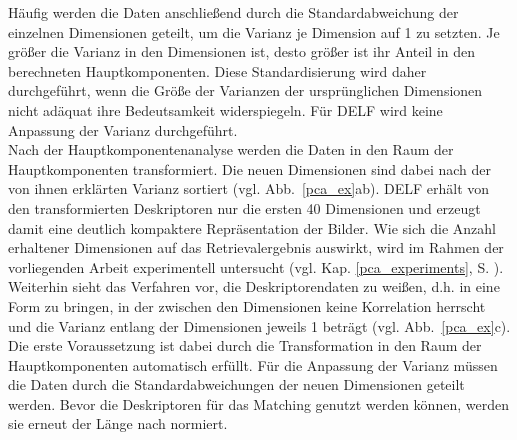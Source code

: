 Häufig werden die Daten anschließend durch die Standardabweichung der einzelnen Dimensionen geteilt, um die Varianz je Dimension auf 1 zu setzten. Je größer die Varianz in den Dimensionen ist, desto größer ist ihr Anteil in den berechneten Hauptkomponenten. Diese Standardisierung wird daher durchgeführt, wenn die Größe der Varianzen der ursprünglichen Dimensionen nicht adäquat ihre Bedeutsamkeit widerspiegeln. Für DELF wird keine Anpassung der Varianz durchgeführt.
\\
Nach der Hauptkomponentenanalyse werden die Daten in den Raum der Hauptkomponenten transformiert. Die neuen Dimensionen sind dabei nach der von ihnen erklärten Varianz sortiert (vgl. Abb.~\ref{pca_ex}ab). DELF erhält von den transformierten Deskriptoren nur die ersten 40 Dimensionen und erzeugt damit eine deutlich kompaktere Repräsentation der Bilder. Wie sich die Anzahl erhaltener Dimensionen auf das Retrievalergebnis auswirkt, wird im Rahmen der vorliegenden Arbeit experimentell untersucht (vgl. Kap. \ref{pca_experiments}, S. \pageref{pca_experiments}). Weiterhin sieht das Verfahren vor, die Deskriptorendaten zu weißen, d.h. in eine Form zu bringen, in der zwischen den Dimensionen keine Korrelation herrscht und die Varianz entlang der Dimensionen jeweils 1 beträgt (vgl. Abb.~\ref{pca_ex}c). Die erste Voraussetzung ist dabei durch die Transformation in den Raum der Hauptkomponenten automatisch erfüllt. Für die Anpassung der Varianz müssen die Daten durch die Standardabweichungen der neuen Dimensionen geteilt werden. Bevor die Deskriptoren für das Matching genutzt werden können, werden sie erneut der Länge nach normiert.
%
